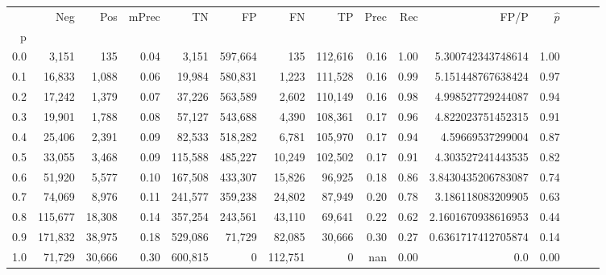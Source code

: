 \begin{tabular}{rrrrrrrrrrrrrrr}
\toprule
{} &      Neg &     Pos & mPrec &       TN &       FP &       FN &       TP &  Prec &   Rec &                FP/P & $\hat{p}$ \\
p   &          &         &       &          &          &          &          &       &       &                     &           \\
\midrule
0.0 &    3,151 &     135 &  0.04 &    3,151 &  597,664 &      135 &  112,616 &  0.16 &  1.00 &   5.300742343748614 &      1.00 \\
0.1 &   16,833 &   1,088 &  0.06 &   19,984 &  580,831 &    1,223 &  111,528 &  0.16 &  0.99 &   5.151448767638424 &      0.97 \\
0.2 &   17,242 &   1,379 &  0.07 &   37,226 &  563,589 &    2,602 &  110,149 &  0.16 &  0.98 &   4.998527729244087 &      0.94 \\
0.3 &   19,901 &   1,788 &  0.08 &   57,127 &  543,688 &    4,390 &  108,361 &  0.17 &  0.96 &   4.822023751452315 &      0.91 \\
0.4 &   25,406 &   2,391 &  0.09 &   82,533 &  518,282 &    6,781 &  105,970 &  0.17 &  0.94 &    4.59669537299004 &      0.87 \\
0.5 &   33,055 &   3,468 &  0.09 &  115,588 &  485,227 &   10,249 &  102,502 &  0.17 &  0.91 &   4.303527241443535 &      0.82 \\
0.6 &   51,920 &   5,577 &  0.10 &  167,508 &  433,307 &   15,826 &   96,925 &  0.18 &  0.86 &  3.8430435206783087 &      0.74 \\
0.7 &   74,069 &   8,976 &  0.11 &  241,577 &  359,238 &   24,802 &   87,949 &  0.20 &  0.78 &   3.186118083209905 &      0.63 \\
0.8 &  115,677 &  18,308 &  0.14 &  357,254 &  243,561 &   43,110 &   69,641 &  0.22 &  0.62 &  2.1601670938616953 &      0.44 \\
0.9 &  171,832 &  38,975 &  0.18 &  529,086 &   71,729 &   82,085 &   30,666 &  0.30 &  0.27 &  0.6361717412705874 &      0.14 \\
1.0 &   71,729 &  30,666 &  0.30 &  600,815 &        0 &  112,751 &        0 &   nan &  0.00 &                 0.0 &      0.00 \\
\bottomrule
\end{tabular}
